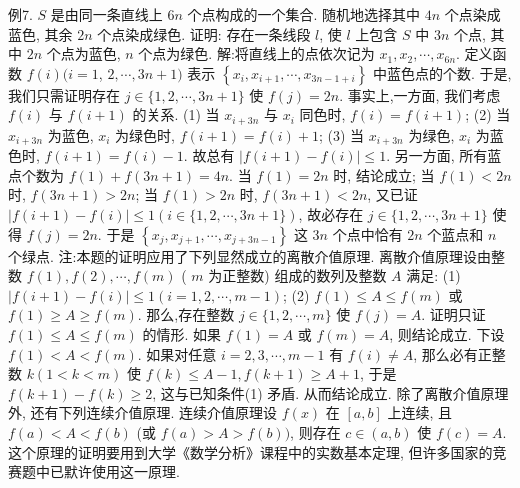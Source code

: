 例7. $S$ 是由同一条直线上 $6 n$ 个点构成的一个集合.
随机地选择其中 $4 n$ 个点染成蓝色, 其余 $2 n$ 个点染成绿色.
证明: 存在一条线段 $l$, 使 $l$ 上包含 $S$ 中 $3 n$ 个点, 其中 $2 n$ 个点为蓝色, $n$ 个点为绿色.
解:将直线上的点依次记为 $x_1, x_2, \cdots, x_{6 n}$. 定义函数 $f(i)(i=1$, $2, \cdots, 3 n+1)$ 表示 $\left\{x_i, x_{i+1}, \cdots, x_{3 n-1+i}\right\}$ 中蓝色点的个数.
于是, 我们只需证明存在 $j \in\{1,2, \cdots, 3 n+1\}$ 使 $f(j)=2 n$.
事实上,一方面, 我们考虑 $f(i)$ 与 $f(i+1)$ 的关系.
(1) 当 $x_{i+3 n}$ 与 $x_i$ 同色时, $f(i)=f(i+1)$;
(2) 当 $x_{i+3 n}$ 为蓝色, $x_i$ 为绿色时, $f(i+1)=f(i)+1$;
(3) 当 $x_{i+3 n}$ 为绿色, $x_i$ 为蓝色时, $f(i+1)=f(i)-1$.
故总有 $|f(i+1)-f(i)| \leqslant 1$.
另一方面, 所有蓝点个数为 $f(1)+f(3 n+1)=4 n$. 当 $f(1)=2 n$ 时, 结论成立; 当 $f(1)<2 n$ 时, $f(3 n+1)>2 n$; 当 $f(1)>2 n$ 时, $f(3 n+1)<2 n$, 又已证 $|f(i+1)-f(i)| \leqslant 1(i \in\{1,2, \cdots, 3 n+1\})$, 故必存在 $j \in\{1,2, \cdots, 3 n+1\}$ 使得 $f(j)=2 n$. 于是 $\left\{x_j, x_{j+1}, \cdots, x_{j+3 n-1}\right\}$ 这 $3 n$ 个点中恰有 $2 n$ 个蓝点和 $n$ 个绿点.
注:本题的证明应用了下列显然成立的离散介值原理.
离散介值原理设由整数 $f(1), f(2), \cdots, f(m)$ ( $m$ 为正整数) 组成的数列及整数 $A$ 满足:
(1) $|f(i+1)-f(i)| \leqslant 1(i=1,2, \cdots, m-1)$;
(2) $f(1) \leqslant A \leqslant f(m)$ 或 $f(1) \geqslant A \geqslant f(m)$.
那么,存在整数 $j \in\{1,2, \cdots, m\}$ 使 $f(j)=A$.
证明只证 $f(1) \leqslant A \leqslant f(m)$ 的情形.
如果 $f(1)=A$ 或 $f(m)=A$, 则结论成立.
下设 $f(1)<A<f(m)$. 如果对任意 $i=2,3, \cdots, m-1$ 有 $f(i) \neq A$, 那么必有正整数 $k(1<k<m)$ 使 $f(k) \leqslant A-1, f(k+1) \geqslant A+1$, 于是 $f(k+1)-f(k) \geqslant 2$, 这与已知条件(1) 矛盾.
从而结论成立.
除了离散介值原理外, 还有下列连续介值原理.
连续介值原理设 $f(x)$ 在 $[a, b]$ 上连续, 且 $f(a)<A<f(b)$ (或 $f(a) >A>f(b))$, 则存在 $c \in(a, b)$ 使 $f(c)=A$.
这个原理的证明要用到大学《数学分析》课程中的实数基本定理, 但许多国家的竞赛题中已默许使用这一原理.


